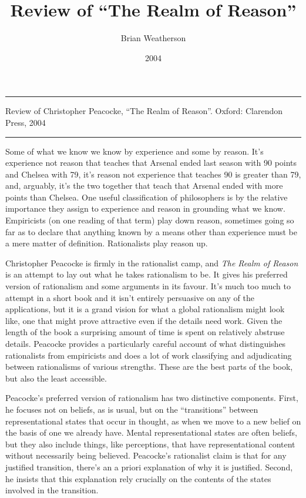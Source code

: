 \documentclass[
  10pt,
  letterpaper,
  DIV=11,
  numbers=noendperiod,
  twoside]{scrartcl}
\title{Review of ``The Realm of Reason''}
\author{Brian Weatherson}
\date{2004}
\renewenvironment{abstract}
 {\vspace{-1.25cm}
 \quotation\small\noindent\rule{\linewidth}{.5pt}\par\smallskip
 \noindent }
 {\par\noindent\rule{\linewidth}{.5pt}\endquotation}
\begin{document}
\maketitle
\begin{abstract}
Review of Christopher Peacocke, ``The Realm of Reason''. Oxford:
Clarendon Press, 2004
\end{abstract}


Some of what we know we know by experience and some by reason. It's
experience not reason that teaches that Arsenal ended last season with
90 points and Chelsea with 79, it's reason not experience that teaches
90 is greater than 79, and, arguably, it's the two together that teach
that Arsenal ended with more points than Chelsea. One useful
classification of philosophers is by the relative importance they assign
to experience and reason in grounding what we know. Empiricists (on one
reading of that term) play down reason, sometimes going so far as to
declare that anything known by a means other than experience must be a
mere matter of definition. Rationalists play reason up.

Christopher Peacocke is firmly in the rationalist camp, and \emph{The
Realm of Reason} is an attempt to lay out what he takes rationalism to
be. It gives his preferred version of rationalism and some arguments in
its favour. It's much too much to attempt in a short book and it isn't
entirely persuasive on any of the applications, but it is a grand vision
for what a global rationalism might look like, one that might prove
attractive even if the details need work. Given the length of the book a
surprising amount of time is spent on relatively abstruse details.
Peacocke provides a particularly careful account of what distinguishes
rationalists from empiricists and does a lot of work classifying and
adjudicating between rationalisms of various strengths. These are the
best parts of the book, but also the least accessible.

Peacocke's preferred version of rationalism has two distinctive
components. First, he focuses not on beliefs, as is usual, but on the
``transitions'' between representational states that occur in thought,
as when we move to a new belief on the basis of one we already have.
Mental representational states are often beliefs, but they also include
things, like perceptions, that have representational content without
necessarily being believed. Peacocke's rationalist claim is that for any
justified transition, there's an a priori explanation of why it is
justified. Second, he insists that this explanation rely crucially on
the contents of the states involved in the transition.
\end{document}
